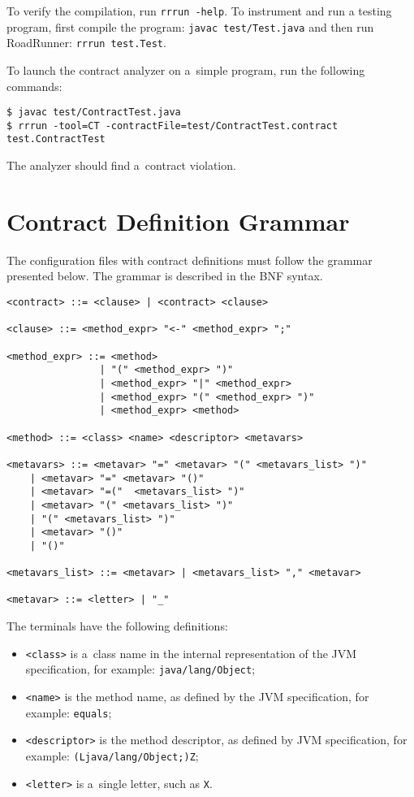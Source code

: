 To verify the compilation, run \texttt{rrrun -help}. To instrument and run a
testing program, first compile the program: \texttt{javac test/Test.java} and
then run RoadRunner: \texttt{rrrun test.Test}.

To launch the contract analyzer on a~simple program, run the following commands:
\begin{lstlisting}
$ javac test/ContractTest.java
$ rrrun -tool=CT -contractFile=test/ContractTest.contract test.ContractTest
\end{lstlisting}
The analyzer should find a~contract violation.

\chapter{Contract Definition Grammar}
\label{appGrammar}

The configuration files with contract definitions must follow the grammar
presented below. The grammar is described in the BNF syntax.

\begin{lstlisting}
<contract> ::= <clause> | <contract> <clause>

<clause> ::= <method_expr> "<-" <method_expr> ";"

<method_expr> ::= <method>
                | "(" <method_expr> ")"
                | <method_expr> "|" <method_expr>
                | <method_expr> "(" <method_expr> ")"
                | <method_expr> <method>

<method> ::= <class> <name> <descriptor> <metavars>

<metavars> ::= <metavar> "=" <metavar> "(" <metavars_list> ")"
    | <metavar> "=" <metavar> "()" 
    | <metavar> "=("  <metavars_list> ")"
    | <metavar> "(" <metavars_list> ")"
    | "(" <metavars_list> ")"
    | <metavar> "()" 
    | "()"

<metavars_list> ::= <metavar> | <metavars_list> "," <metavar>

<metavar> ::= <letter> | "_"
\end{lstlisting}

The terminals have the following definitions:
\begin{itemize}
    \item \texttt{<class>} is a~class name in the internal representation of
        the JVM specification, for example: \texttt{java/lang/Object};
    \item \texttt{<name>} is the method name, as defined by the JVM
        specification, for example: \texttt{equals};
    \item \texttt{<descriptor>} is the method descriptor, as defined by JVM
        specification, for example: \texttt{(Ljava/lang/Object;)Z};
    \item \texttt{<letter>} is a~single letter, such as \texttt{X}.
\end{itemize}

